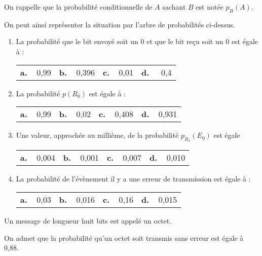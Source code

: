 \documentclass[11pt]{article}
\begin{document}
On rappelle que la probabilité conditionnelle de $A$ sachant $B$ est notée $p_B(A)$.

On peut ainsi représenter la situation par l'arbre de probabilités ci-dessus.

\medskip

\begin{enumerate}
\item La probabilité que le bit envoyé soit un $0$ et que le bit reçu soit un $0$ est égale à :

\begin{center}
\begin{tabularx}{\linewidth}{*{4}{X}}
\textbf{a.~~}0,99 &\textbf{b.~~}0,396 &\textbf{c.~~}0,01 &\textbf{d.~~} 0,4
\end{tabularx}
\end{center}

\item La probabilité  $p\left(R_0\right)$ est égale à :
\begin{center}
\begin{tabularx}{\linewidth}{*{4}{X}}
\textbf{a.~~}0,99 &\textbf{b.~~}0,02 &\textbf{c.~~}0,408 &\textbf{d.~~}0,931
\end{tabularx}
\end{center}
\item Une valeur, approchée au millième, de la probabilité $p_{R_1}\left(E_0\right)$ est égale 
\begin{center}
\begin{tabularx}{\linewidth}{*{4}{X}}
\textbf{a.~~}0,004 &\textbf{b.~~}0,001 &\textbf{c.~~}0,007 &\textbf{d.~~}0,010
\end{tabularx}
\end{center}
\item La probabilité de l'évènement \og  il y a une erreur de transmission \fg{} est égale à :
\begin{center}
\begin{tabularx}{\linewidth}{*{4}{X}}
\textbf{a.~~}0,03 &\textbf{b.~~}0,016 &\textbf{c.~~}0,16 &\textbf{d.~~}0,015
\end{tabularx}
\end{center}
\end{enumerate}

Un message de longueur huit bits est appelé un octet.

On admet que la probabilité qu'un octet soit transmis sans erreur est égale à 0,88.
\end{document}
